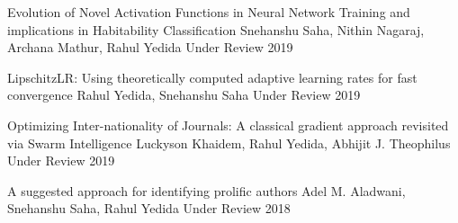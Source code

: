 


\begin{cvhonors}

    \cvhonor
        {Evolution of Novel Activation Functions in Neural Network Training and implications in Habitability Classification}
        {Snehanshu Saha, Nithin Nagaraj, Archana Mathur, Rahul Yedida}
        {Under Review}
        {2019}

  \cvhonor
    {LipschitzLR: Using theoretically computed adaptive learning rates for fast convergence}
    {Rahul Yedida, Snehanshu Saha}
    {Under Review} %
    {2019} %


  \cvhonor
    {Optimizing Inter-nationality of Journals: A classical gradient approach revisited via Swarm Intelligence}
    {Luckyson Khaidem, Rahul Yedida, Abhijit J. Theophilus}
    {Under Review} %
    {2019} %
    
  \cvhonor
    {A suggested approach for identifying prolific authors}
    {Adel M. Aladwani, Snehanshu Saha, Rahul Yedida}
    {Under Review} %
    {2018} %

\end{cvhonors}